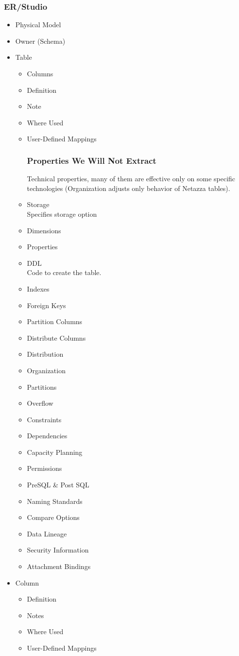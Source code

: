 \subsubsection{ER/Studio}

\begin{itemize}
	\item Physical Model \\
	\item Owner (Schema)
	\item Table
	\begin{itemize}
		\item Columns
		\item Definition
		\item Note
		\item Where Used
		\item User-Defined Mappings
		\subsubsection{Properties We Will Not Extract}
		Technical properties, many of them are effective only on some specific technologies (Organization adjusts only behavior of Netazza tables). 
		\item Storage \\ 
		Specifies storage option
		\item Dimensions
		\item Properties
		\item DDL \\ 
		Code to create the table.
		\item Indexes
		\item Foreign Keys
		\item Partition Columns
		\item Distribute Columns
		\item Distribution
		\item Organization
		\item Partitions
		\item Overflow
		\item Constraints
		\item Dependencies
		\item Capacity Planning
		\item Permissions
		\item PreSQL \& Post SQL
		\item Naming Standards
		\item Compare Options
		\item Data Lineage
		\item Security Information
		\item Attachment Bindings
	\end{itemize}
	\item Column
	\begin{itemize}
		\item Definition
		\item Notes
		\item Where Used
		\item User-Defined Mappings

\end{itemize}
\end{itemize}
